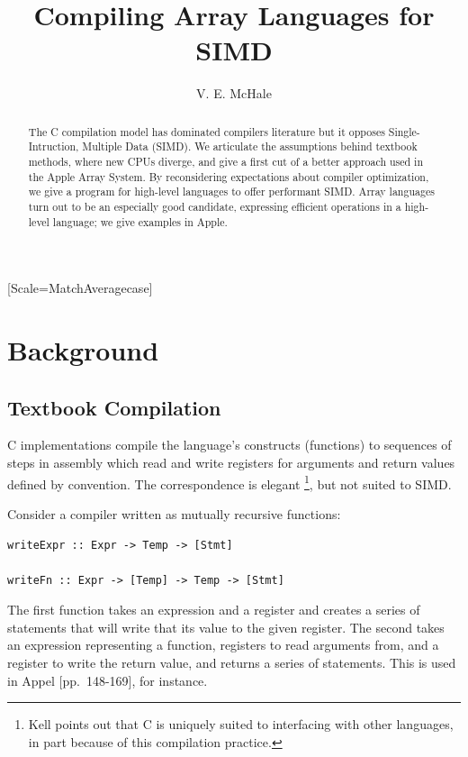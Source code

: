 \documentclass{article}
\begin{document}
\VerbatimFootnotes
\setmonofont{Jet Brains Mono}[Scale=MatchAveragecase]

\author{V. E. McHale}
\title{Compiling Array Languages for SIMD}
\maketitle

\begin{abstract}
  The C compilation model has dominated compilers literature but it opposes Single-Intruction, Multiple Data (SIMD). We articulate the assumptions behind textbook methods, where new CPUs diverge, and give a first cut of a better approach used in the Apple Array System. By reconsidering expectations about compiler optimization, we give a program for high-level languages to offer performant SIMD. Array languages turn out to be an especially good candidate, expressing efficient operations in a high-level language; we give examples in Apple.
\end{abstract}

\tableofcontents

\section{Background}

\subsection{Textbook Compilation}
\label{sec:map}

C implementations compile the language's constructs (functions) to sequences of steps in assembly which read and write registers for arguments and return values defined by convention. The correspondence is elegant \footnote{Kell \cite{kell2017} points out that C is uniquely suited to interfacing with other languages, in part because of this compilation practice.}, but not suited to SIMD.

Consider a compiler written as mutually recursive functions:

\begin{verbatim}
writeExpr :: Expr -> Temp -> [Stmt]

writeFn :: Expr -> [Temp] -> Temp -> [Stmt]
\end{verbatim}

The first function takes an expression and a register and creates a series of statements that will write that its value to the given register. The second takes an expression representing a function, registers to read arguments from, and a register to write the return value, and returns a series of statements. This is used in Appel \cite{appel1998}[pp.~148-169], for instance.
\end{document}
